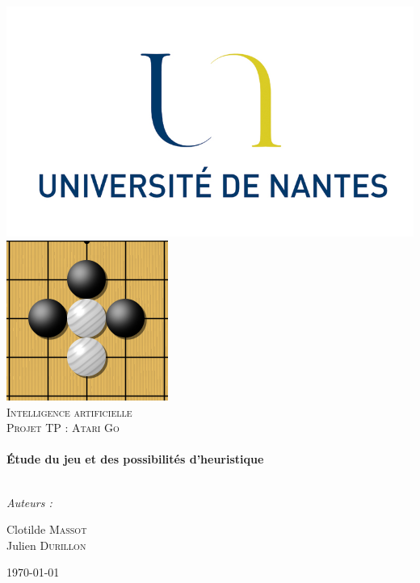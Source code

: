\begin{titlepage}

\begin{center}


\includegraphics[scale=1.00]{./logo_fac.png}
\includegraphics[scale=0.5]{./logogo.png}\\[1cm]

\textsc{\LARGE Intelligence artificielle}\\[1.5cm]

\textsc{\Large Projet TP : Atari Go}\\[0.5cm]


\HRule \\[0.4cm]
{ \huge \bfseries Étude du jeu et des possibilités d'heuristique}\\[0.4cm]

\HRule \\[1.5cm]

\begin{minipage}{0.4\textwidth}
\begin{flushleft} \large
\emph{Auteurs :}\\[0.2cm]
\end{flushleft}
\end{minipage}

\begin{minipage}{0.5\textwidth}
\begin{flushright} \large
Clotilde \textsc{Massot}\\
Julien \textsc{Durillon}
\end{flushright}
\end{minipage}

\vfill

{\large \today}

\end{center}
\end{titlepage}
